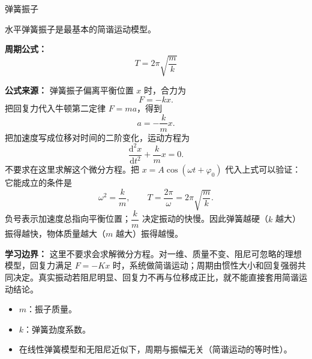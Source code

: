 \begin{conceptbox}{弹簧振子}

水平弹簧振子是最基本的简谐运动模型。

\begin{center}


\label{fig:spring-oscillator}
\end{center}

\textbf{周期公式：}
\[
\boxed{T = 2\pi\sqrt{\frac{m}{k}}}
\]

\textbf{公式来源：}
弹簧振子偏离平衡位置 $x$ 时，合力为
\[
F=-kx.
\]
把回复力代入牛顿第二定律 $F=ma$，得到
\[
a=-\frac{k}{m}x.
\]
把加速度写成位移对时间的二阶变化，运动方程为
\[
\frac{\mathrm d^2x}{\mathrm dt^2}+\frac{k}{m}x=0.
\]
不要求在这里求解这个微分方程。把 $x=A\cos(\omega t+\varphi_0)$ 代入上式可以验证：它能成立的条件是
\[
\omega^2=\frac{k}{m},\qquad T=\frac{2\pi}{\omega}=2\pi\sqrt{\frac{m}{k}}.
\]
负号表示加速度总指向平衡位置；$\dfrac{k}{m}$ 决定振动的快慢。因此弹簧越硬（$k$ 越大）振得越快，物体质量越大（$m$ 越大）振得越慢。

\textbf{学习边界：} 这里不要求会求解微分方程。对一维、质量不变、阻尼可忽略的理想模型，回复力满足 $F=-Kx$ 时，系统做简谐运动；周期由惯性大小和回复强弱共同决定。真实振动若阻尼明显、回复力不再与位移成正比，就不能直接套用简谐运动结论。

\begin{itemize}
  \item $m$：振子质量。
  \item $k$：弹簧劲度系数。
  \item 在线性弹簧模型和无阻尼近似下，周期与振幅无关（简谐运动的等时性）。
\end{itemize}

\end{conceptbox}


